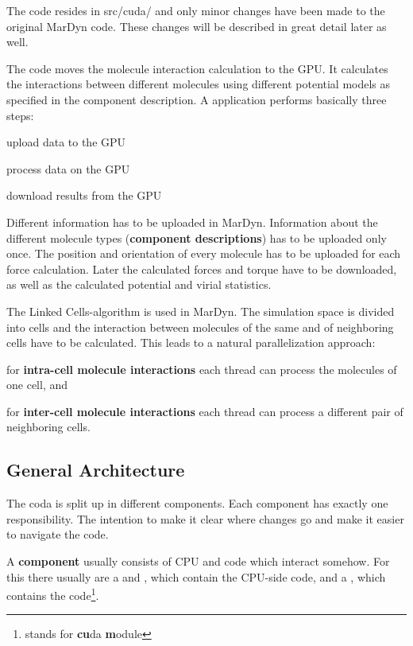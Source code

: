 The code resides in src/cuda/ and only minor changes have been made to the original MarDyn code. These changes will be described in great detail later as well.

The \cuda{} code moves the molecule interaction calculation to the GPU. It calculates the interactions between different molecules using different potential models as specified in the component description.
A \cuda{} application performs basically three steps:
\begin{compactenum}
\item upload data to the GPU
\item process data on the GPU
\item download results from the GPU
\end{compactenum} 
Different information has to be uploaded in MarDyn. Information about the different molecule types (\textbf{component descriptions}) has to be uploaded only once. The position and orientation of every molecule has to be uploaded for each force calculation. 
Later the calculated forces and torque have to be downloaded, as well as the calculated potential and virial statistics.

The Linked Cells-algorithm is used in MarDyn. The simulation space is divided into cells and the interaction between molecules of the same and of neighboring cells have to be calculated.
This leads to a natural parallelization approach:
\begin{compactitem}
\item for \textbf{intra-cell molecule interactions} each thread can process the molecules of one cell, and
\item for \textbf{inter-cell molecule interactions} each thread can process a different pair of neighboring cells.
\end{compactitem}

\subsection{General Architecture}
The \cuda{} coda is split up in different components. Each component has exactly one responsibility.
The intention to make it clear where changes go and make it easier to navigate the code.

A \textbf{component} usually consists of CPU and \cuda{} code which interact somehow. For this there usually are a  and , which contain the CPU-side code, and a , which contains the \cuda{} code\footnote{ stands for \textbf{cu}da \textbf{m}odule}.

